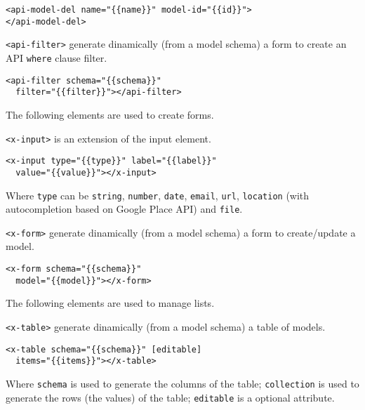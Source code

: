 \begin{lstlisting}[language=HTML5]
<api-model-del name="{{name}}" model-id="{{id}}">
</api-model-del>
\end{lstlisting}

\texttt{<api-filter>} generate dinamically (from a model schema) a form to create an API \texttt{where} clause filter.

\begin{lstlisting}[language=HTML5]
<api-filter schema="{{schema}}"
  filter="{{filter}}"></api-filter>
\end{lstlisting}

The following elements are used to create forms. 

\vspace{0.2cm}

\texttt{<x-input>} is an extension of the input element. 

\begin{lstlisting}[language=HTML5]
<x-input type="{{type}}" label="{{label}}"
  value="{{value}}"></x-input>
\end{lstlisting}

Where \texttt{type} can be \texttt{string}, \texttt{number}, \texttt{date}, \texttt{email}, \texttt{url}, \texttt{location} (with autocompletion based on Google Place API) and \texttt{file}.

\vspace{0.2cm}

\texttt{<x-form>} generate dinamically (from a model schema) a form to create/update a model.

\begin{lstlisting}[language=HTML5]
<x-form schema="{{schema}}" 
  model="{{model}}"></x-form>
\end{lstlisting}

The following elements are used to manage lists. 

\vspace{0.2cm}

\texttt{<x-table>} generate dinamically (from a model schema) a table of models. 

\begin{lstlisting}[language=HTML5]
<x-table schema="{{schema}}" [editable] 
  items="{{items}}"></x-table>
\end{lstlisting}

Where \texttt{schema} is used to generate the columns of the table; 
\texttt{collection} is used to generate the rows (the values) of the table;
\texttt{editable} is a optional attribute.

